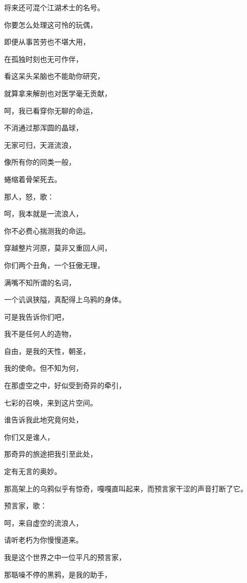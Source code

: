 \documentclass[UTF8]{article}
\begin{document}
\par 将来还可混个江湖术士的名号。
\par 你要怎么处理这可怜的玩偶，
\par 即便从事苦劳也不堪大用，
\par 在孤独时刻也无可作伴，
\par 看这呆头呆脑也不能助你研究，
\par 就算拿来解剖也对医学毫无贡献，
\par 呵，我已看穿你无聊的命运，
\par 不消通过那浑圆的晶球，
\par 无家可归，天涯流浪，
\par 像所有你的同类一般，
\par 蜷缩着骨架死去。
\\[0.6cm]
\par 那人，怒，歌：
\\[0.6cm]
\par 呵，我本就是一流浪人，
\par 你不必费心揣测我的命运。
\par 穿越整片河原，莫非又重回人间，
\par 你们两个丑角，一个狂傲无理，
\par 满嘴不知所谓的名词，
\par 一个讥讽狭隘，真配得上乌鸦的身体。
\par 可是我告诉你们吧，
\par 我不是任何人的造物，
\par 自由，是我的天性，朝圣，
\par 我的使命。但不知为何，
\par 在那虚空之中，好似受到奇异的牵引，
\par 七彩的召唤，来到这片空间。
\par 谁告诉我此地究竟何处，
\par 你们又是谁人，
\par 那奇异的旅途把我引至此处，
\par 定有无言的奥妙。
\\[0.6cm]
\par 那高架上的乌鸦似乎有惊奇，嘎嘎直叫起来，而预言家干涩的声音打断了它。
\\[0.6cm]
\par 预言家，歌：
\\[0.6cm]
\par 呵，来自虚空的流浪人，
\par 请听老朽为你慢慢道来。
\par 我是这个世界之中一位平凡的预言家，
\par 那聒噪不停的黑鸦，是我的助手，
\end{document}
